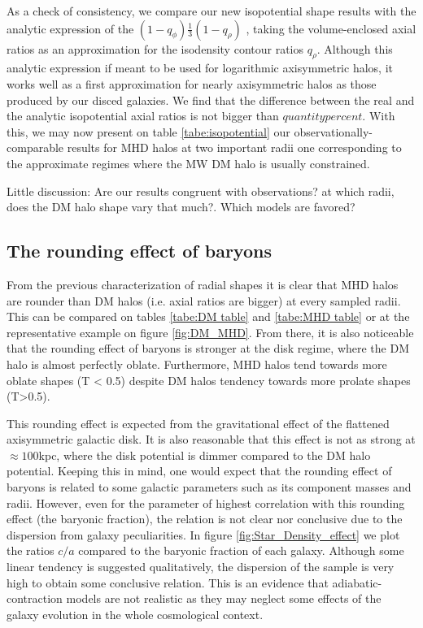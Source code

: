 \documentclass[a4paper,fleqn,usenatbib]{mnras}
\begin{document}
As a check of consistency, we compare our new isopotential shape
results with the analytic expression of the
$(1-q_{\phi})\frac{1}{3}(1-q_{\rho})$ \citep{Binney_and_Tremaine_2008}, taking the volume-enclosed axial ratios
as an approximation for the isodensity contour ratios
$q_{\rho}$. Although this analytic expression if meant to be used for
logarithmic axisymmetric halos, it works well as a first approximation
for nearly axisymmetric halos as those produced by our disced
galaxies. We find that the difference between the real and the
analytic isopotential axial ratios is not bigger than $quantity
percent$. With this, we may now present on table
\ref{tabe:isopotential} our observationally-comparable results for MHD
halos at two important radii one corresponding to the approximate
regimes where the MW DM halo is usually constrained. 

Little discussion: Are our results congruent with observations? at
which radii, does the DM halo shape vary that much?. Which models are
favored? 


\subsection{The rounding effect of baryons}

From the previous characterization of radial shapes it is clear that
MHD halos are rounder than DM halos (i.e. axial ratios are bigger) at
every sampled radii. This can be compared on tables \ref{tabe:DM
  table} and \ref{tabe:MHD table} or at the representative example on
figure \ref{fig:DM_MHD}. From there, it is also noticeable that the
rounding effect of baryons is stronger at the disk regime, where the
DM halo is almost perfectly oblate. Furthermore, MHD halos tend
towards more oblate shapes (T < 0.5) despite DM halos tendency towards
more prolate shapes (T>0.5). 

This rounding effect is expected from the gravitational effect of the
flattened axisymmetric galactic disk. It is also reasonable that this
effect is not as strong at $\approx 100$kpc, where the disk potential
is dimmer compared to the DM halo potential. Keeping this in mind, one
would expect that the rounding effect of baryons is related to some
galactic parameters such as its component masses and radii. However,
even for the parameter of highest correlation with this rounding
effect (the baryonic fraction), the relation is not clear nor
conclusive due to the dispersion from galaxy peculiarities. In figure
\ref{fig:Star_Density_effect} we plot the ratios $c/a$ compared to the
baryonic fraction of each galaxy. Although some linear tendency is
suggested qualitatively, the dispersion of the sample is very high to
obtain some conclusive relation. This is an evidence that
adiabatic-contraction models are not realistic as they may neglect
some effects of the galaxy evolution in the whole cosmological
context.  
\end{document}
